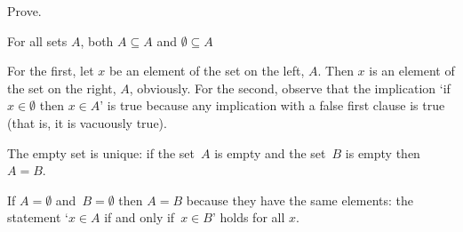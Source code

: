 \documentclass{ibl}  %
\begin{document}
\begin{problem} \label{ex:EmptySetUnique}
Prove. 
\begin{exes}
\begin{exercise} 
   For all sets $A$, both $A\subseteq A$ and $\emptyset\subseteq A$
\end{exercise}
\begin{answer}
  For the first, let $x$ be an element of the set on the left, $A$.
  Then $x$ is an element of the set on the right, $A$, obviously.
  For the second, observe that the implication 
  `if $x\in\emptyset$ then $x\in A$' is true 
  because any implication with a false first clause is true
  (that is, it is vacuously true).  
\end{answer}
\begin{exercise} 
  The empty set is unique: if the set~$A$ is empty and 
  the set~$B$ is empty then $A=B$.
\end{exercise}
\begin{answer}
  If $A=\emptyset$ and~$B=\emptyset$ then $A=B$ because they have the
  same elements: the statement `$x\in A$ if and only if~$x\in B$' holds   
  for all $x$.
\end{answer}
\end{exes}

\end{problem}
\end{document}
